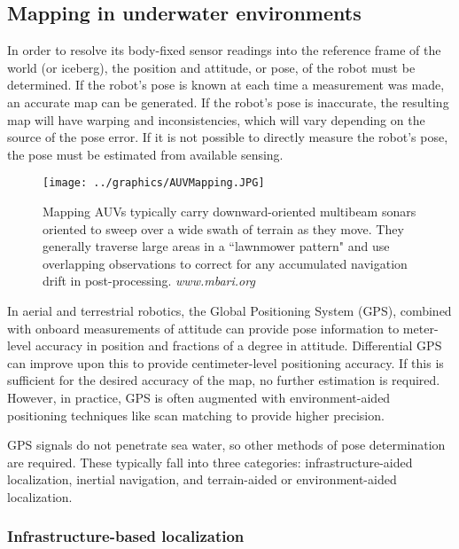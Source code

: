 \subsection{Mapping in underwater environments}

In order to resolve its body-fixed sensor readings into the reference frame of the world (or iceberg), the position and attitude, or pose, of the robot must be determined. If the robot's pose is known at each time a measurement was made, an accurate map can be generated. If the robot's pose is inaccurate, the resulting map will have warping and inconsistencies, which will vary depending on the source of the pose error. If it is not possible to directly measure the robot's pose, the pose must be estimated from available sensing. 

\begin{figure}[htbp]
   \centering
   \texttt{[image: ../graphics/AUVMapping.JPG]} %
   \caption{Mapping AUVs typically carry downward-oriented multibeam sonars oriented to sweep over a wide swath of terrain as they move. They generally traverse large areas in a ``lawnmower pattern" and use overlapping observations to correct for any accumulated navigation drift in post-processing. \emph{www.mbari.org} }
   \label{fig:AUVbathyMapping}
\end{figure}

In aerial and terrestrial robotics, the Global Positioning System (GPS), combined with onboard measurements of attitude can provide pose information to meter-level accuracy in position and fractions of a degree in attitude. Differential GPS can improve upon this to provide centimeter-level positioning accuracy. If this is sufficient for the desired accuracy of the map, no further estimation is required. However, in practice, GPS is often augmented with environment-aided positioning techniques like scan matching to provide higher precision. \cite{XXX}

GPS  signals do not penetrate sea water, so other methods of pose determination are required. These typically fall into three categories: infrastructure-aided localization, inertial navigation, and terrain-aided or environment-aided localization. 

\subsubsection{Infrastructure-based localization}

